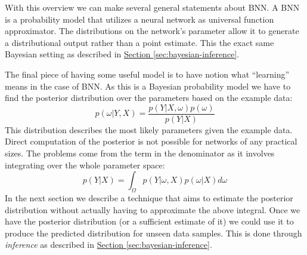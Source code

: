 \documentclass[12pt,a4paper,twoside]{scrartcl}
\numberwithin{equation}{section}
\newcommand{\refsec}[1]{\hyperref[#1]{Section \ref*{#1}}}
\begin{document}
With this overview we can make several general statements about BNN. A BNN is a probability model that utilizes a neural network as universal function approximator. The distributions on the network's parameter allow it to generate a distributional output rather than a point estimate. This the exact same Bayesian setting as described in \refsec{sec:bayesian-inference}. 

The final piece of having some useful model is to have notion what ``learning'' means in the case of BNN. As this is a Bayesian probability model we have to find the posterior distribution over the parameters based on the example data:
\begin{equation}
  p(\omega|Y,X)=\frac{p(Y|X,\omega)p(\omega)}{p(Y|X)}
\end{equation}
This distribution describes the most likely parameters given the example data. Direct computation of the posterior is not possible for networks of any practical sizes. The problems come from the term in the denominator as it involves integrating over the whole parameter space:
\begin{equation}
  p(Y|X) = \int_{\Omega} p(Y|\omega , X)p(\omega|X)d \omega
\end{equation}
In the next section we describe a technique that aims to estimate the posterior distribution without actually having to approximate the above integral. Once we have the posterior distribution (or a sufficient estimate of it) we could use it to produce the predicted distribution for unseen data samples. This is done through \emph{inference} as described in \refsec{sec:bayesian-inference}.
\end{document}

